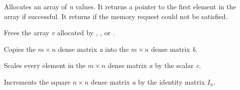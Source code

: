 \documentclass[letterpaper,10pt,english]{sphinxmanual}
\begin{document}

\begin{fulllineitems}
\label{linear_solvers/DLS:newRealArray}
Allocates an array of \emph{n}  values. It returns a pointer
to the first element in the array if successful. It returns
 if the memory request could not be satisfied.

\end{fulllineitems}


\begin{fulllineitems}
\label{linear_solvers/DLS:destroyArray}
Frees the array \emph{v} allocated by {\hyperref[linear_solvers/DLS:newLintArray]{}},
{\hyperref[linear_solvers/DLS:newIntArray]{}}, or {\hyperref[linear_solvers/DLS:newRealArray]{}}.

\end{fulllineitems}


\begin{fulllineitems}
\label{linear_solvers/DLS:denseCopy}
Copies the $m \times n$ dense matrix \emph{a} into the $m
\times n$ dense matrix \emph{b}.

\end{fulllineitems}


\begin{fulllineitems}
\label{linear_solvers/DLS:denseScale}
Scales every element in the $m \times n$ dense matrix \emph{a} by
the scalar \emph{c}.

\end{fulllineitems}


\begin{fulllineitems}
\label{linear_solvers/DLS:denseAddIdentity}
Increments the square $n \times n$ dense matrix \emph{a} by the
identity matrix $I_n$.

\end{fulllineitems}
\end{document}
